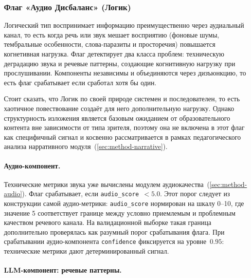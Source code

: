 \subsubsection{Флаг «Аудио Дисбаланс» (Логик)}

Логический тип воспринимает информацию преимущественно через аудиальный канал,
то есть когда речь или звук мешает восприятию (фоновые шумы, тембральные особенности, слова-паразиты и просторечия) повышается когнетивная нагрузка.
Флаг детектирует два класса проблем: техническую деградацию звука
и речевые паттерны, создающие когнитивную нагрузку при прослушивании.
Компоненты независимы и объединяются через дизъюнкцию, то есть 
флаг срабатывает если сработал хотя бы один.

Стоит сказать, что Логик по своей природе системен и последователен, то есть хаотичное повествование создаёт для него дополнительную нагрузку.
Однако структурность изложения является базовым ожиданием от образовательного контента вне зависимости от типа зрителя,
поэтому она не включена в этот флаг как специфичный сигнал и
косвенно рассматривается в рамках педагогического анализа нарративного модуля~(\cref{sec:method-narrative}).

\paragraph{Аудио-компонент.}

Технические метрики звука уже вычислены модулем аудиокачества~(\cref{sec:method-audio}).
Флаг срабатывает, если \texttt{audio\_score}~$< 5.0$.
Этот порог следует из конструкции самой аудио-метрики: \texttt{audio\_score} нормирован на шкалу 0--10,
где значение 5 соответствует границе между условно приемлемым и проблемным качеством речевого канала.
На валидационной выборке такая граница дополнительно проверялась как разумный порог срабатывания флага.
При срабатывании аудио-компонента \texttt{confidence} фиксируется на уровне~$0.95$:
технические метрики дают детерминированный сигнал.

\paragraph{LLM-компонент: речевые паттерны.}

